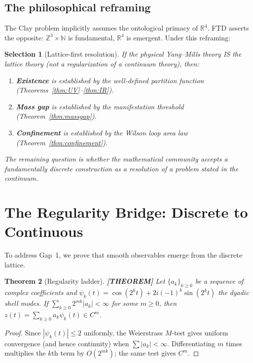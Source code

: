 \documentclass[11pt]{article}
\theoremstyle{tight}
\newtheorem{theorem}{Theorem}[section]
\theoremstyle{plainroman}
\newtheorem{selection}[theorem]{Selection}
\newcommand{\R}{\mathbb{R}}
\newcommand{\Z}{\mathbb{Z}}
\newcommand{\N}{\mathbb{N}}
\begin{document}
\subsection{The philosophical reframing}

The Clay problem implicitly assumes the ontological primacy of $\R^4$.
FTD asserts the opposite: $\Z^3\times\N$ is fundamental, $\R^4$ is emergent.
Under this reframing:

\begin{selection}[Lattice-first resolution]
If the physical Yang--Mills theory IS the lattice theory (not a regularization of a continuum theory), then:
\begin{enumerate}[nosep]
\item \textbf{Existence} is established by the well-defined partition function (Theorems~\ref{thm:UV}--\ref{thm:IR}).
\item \textbf{Mass gap} is established by the manifestation threshold (Theorem~\ref{thm:massgap}).
\item \textbf{Confinement} is established by the Wilson loop area law (Theorem~\ref{thm:confinement}).
\end{enumerate}
The remaining question is whether the mathematical community accepts a fundamentally discrete construction as a resolution of a problem stated in the continuum.
\end{selection}

\section{The Regularity Bridge: Discrete to Continuous}

To address Gap~1, we prove that smooth observables emerge from the discrete lattice.

\begin{theorem}[Regularity ladder]\label{thm:ladder}
\textbf{[THEOREM]}
Let $\{a_k\}_{k\ge 0}$ be a sequence of complex coefficients and $\psi_k(t)=\cos(2^k t)+2i(-1)^k\sin(2^k t)$ the dyadic shell modes.
If $\sum_{k\ge 0}2^{mk}|a_k|<\infty$ for some $m\ge 0$, then $z(t)=\sum_{k\ge 0}a_k\psi_k(t)\in C^m$.
\end{theorem}
\begin{proof}
Since $|\psi_k(t)|\le 2$ uniformly, the Weierstrass $M$-test gives uniform convergence (and hence continuity) when $\sum|a_k|<\infty$.
Differentiating $m$ times multiplies the $k$th term by $O(2^{mk})$; the same test gives $C^m$.
\end{proof}
\end{document}
